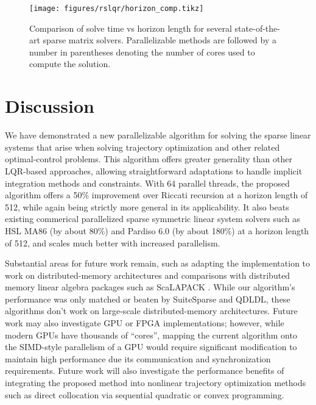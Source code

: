 \documentclass[../root.tex]{subfiles}
\newcommand{\0}{{\transparent{0} \resizebox{\mycellheight}{\mycellheight}{0}}}
\begin{document}
\begin{figure}
    \centering 
    \texttt{[image: figures/rslqr/horizon\_comp.tikz]}
    \caption{Comparison of solve time vs horizon length for several state-of-the-art 
    sparse matrix solvers. Parallelizable methods are followed by a number in parentheses 
    denoting the number of cores used to compute the solution. }
    \label{fig:horizon_comp}
\end{figure}

\section{Discussion} \label{sec:rslqr_conclusion}

We have demonstrated a new parallelizable algorithm for solving the sparse
linear systems that arise when solving trajectory optimization and other related
optimal-control problems.  This algorithm offers greater generality than other
LQR-based approaches, allowing straightforward adaptations to handle implicit
integration methods and constraints. With 64 parallel threads, the proposed
algorithm offers a 50\% improvement over Riccati recursion at a horizon length
of 512, while again being strictly more general in its applicability. It also
beats existing commerical parallelized sparse symmetric linear system solvers
such as HSL MA86 (by about 80\%) and Pardiso 6.0 (by about 180\%) at a horizon
length of 512, and scales much better with increased parallelism. 

Substantial areas for future work remain, such as adapting the implementation to work on
distributed-memory architectures and comparisons with distributed memory linear algebra
packages such as ScaLAPACK \cite{tennessee_ScaLAPACK_}. While our algorithm's performance was only
matched or beaten by SuiteSparse and QDLDL, these algorithms don't work on large-scale
distributed-memory architectures.  Future work may also investigate GPU or FPGA 
implementations; however, while modern GPUs have thousands of ``cores'', mapping the current
algorithm onto the SIMD-style parallelism of a GPU would require significant modification to maintain high performance due its communication and
synchronization requirements.  Future work will also investigate the performance benefits of
integrating the proposed method into nonlinear trajectory optimization methods such as 
direct collocation via sequential quadratic or convex programming. %

\end{document}
